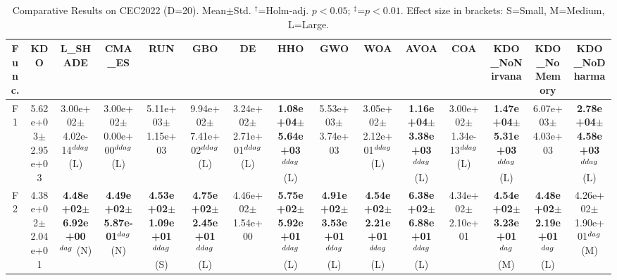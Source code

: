\begin{table}[!t]
\centering\small
\caption{Comparative Results on CEC2022 (D=20). Mean$\pm$Std. $^{\dag}$=Holm-adj. $p<0.05$; $^{\ddag}$=$p<0.01$. Effect size in brackets: S=Small, M=Medium, L=Large.}
\label{tab:enhanced}
\begin{tabular}{c|cccccccccccccc}
\hline
Func. & \textbf{KDO} & L_SHADE & CMA_ES & RUN & GBO & DE & HHO & GWO & WOA & AVOA & COA & KDO_NoNirvana & KDO_NoMemory & KDO_NoDharma \\ \hline\hline
F1  & 5.62e+03$\pm$2.95e+03  & 3.00e+02$\pm$4.02e-14$^{\\ddag}$ (L)  & 3.00e+02$\pm$0.00e+00$^{\\ddag}$ (L)  & 5.11e+03$\pm$1.15e+03   & 9.94e+02$\pm$7.41e+02$^{\\ddag}$ (L)  & 3.24e+02$\pm$2.71e+01$^{\\ddag}$ (L)  & \textbf{1.08e+04$\pm$5.64e+03}$^{\\ddag}$ (L)  & 5.53e+03$\pm$3.74e+03   & 3.05e+02$\pm$2.12e+01$^{\\ddag}$ (L)  & \textbf{1.16e+04$\pm$3.38e+03}$^{\\ddag}$ (L)  & 3.00e+02$\pm$1.34e-13$^{\\ddag}$ (L)  & \textbf{1.47e+04$\pm$5.31e+03}$^{\\ddag}$ (L)  & 6.07e+03$\pm$4.03e+03   & \textbf{2.78e+04$\pm$4.58e+03}$^{\\ddag}$ (L) \\ \hline
F2  & 4.38e+02$\pm$2.04e+01  & \textbf{4.48e+02$\pm$6.92e+00}$^{\\dag}$ (N)  & \textbf{4.49e+02$\pm$5.87e-01}$^{\\dag}$ (N)  & \textbf{4.53e+02$\pm$1.09e+01}$^{\\ddag}$ (S)  & \textbf{4.75e+02$\pm$2.45e+01}$^{\\ddag}$ (L)  & 4.46e+02$\pm$1.54e+00   & \textbf{5.75e+02$\pm$5.92e+01}$^{\\ddag}$ (L)  & \textbf{4.91e+02$\pm$3.53e+01}$^{\\ddag}$ (L)  & \textbf{4.54e+02$\pm$2.21e+01}$^{\\ddag}$ (L)  & \textbf{6.38e+02$\pm$6.88e+01}$^{\\ddag}$ (L)  & 4.34e+02$\pm$2.10e+01   & \textbf{4.54e+02$\pm$3.23e+01}$^{\\dag}$ (M)  & \textbf{4.48e+02$\pm$2.19e+01}$^{\\dag}$ (L)  & 4.26e+02$\pm$1.90e+01$^{\\dag}$ (M) \\ \hline

\end{tabular}
\end{table}
